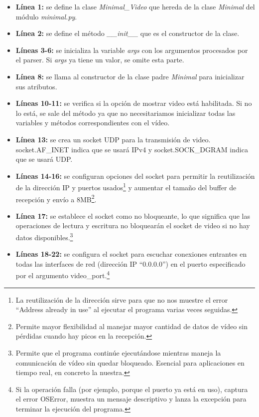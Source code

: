 \begin{itemize}
    \item \textbf{Línea 1:} se define la clase \textit{Minimal\_Video} que hereda de la clase \textit{Minimal} del módulo \textit{minimal.py}.
    \item \textbf{Línea 2:} se define el método \textit{\_\_init\_\_} que es el constructor de la clase.
    \item \textbf{Líneas 3-6:} se inicializa la variable \textit{args} con los argumentos procesados por el parser. Si \textit{args} ya tiene un valor, se omite esta parte.
    \item \textbf{Línea 8:} se llama al constructor de la clase padre \textit{Minimal} para inicializar sus atributos.
    \item \textbf{Líneas 10-11:} se verifica si la opción de mostrar video está habilitada. Si no lo está, se sale del método ya que no necesitariamos inicializar todas las variables y métodos correspondientes con el vídeo.
    \item \textbf{Línea 13:} se crea un socket UDP para la transmisión de video. socket.AF\_INET indica que se usará IPv4 y socket.SOCK\_DGRAM indica que se usará UDP.
    \item \textbf{Líneas 14-16:} se configuran opciones del socket para permitir la reutilización de la dirección IP y puertos usados\footnote{La reutilización de la dirección sirve para que no nos muestre el error ``Address already in use'' al ejecutar el programa varias veces seguidas.} y aumentar el tamaño del buffer de recepción y envío a 8MB\footnote{Permite mayor flexibilidad al manejar mayor cantidad de datos de vídeo sin pérdidas cuando hay picos en la recepción.}.
    \item \textbf{Línea 17:} se establece el socket como no bloqueante, lo que significa que las operaciones de lectura y escritura no bloquearán el socket de video si no hay datos disponibles.\footnote{Permite que el programa continúe ejecutándose mientras maneja la comunicación de vídeo sin quedar bloqueado. Esencial para aplicaciones en tiempo real, en concreto la nuestra.}
    \item \textbf{Líneas 18-22:} se configura el socket para escuchar conexiones entrantes en todas las interfaces de red (dirección IP ``0.0.0.0'') en el puerto especificado por el argumento video\_port.\footnote{ Si la operación falla (por ejemplo, porque el puerto ya está en uso), captura el error OSError, muestra un mensaje descriptivo y lanza la excepción para terminar la ejecución del programa.}

\end{itemize}
